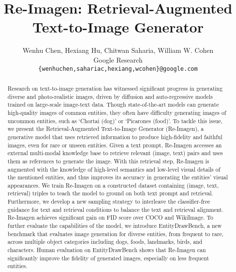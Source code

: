 \documentclass{article} \usepackage{iclr2023_conference,times}
\title{Re-Imagen: Retrieval-Augmented \\ Text-to-Image Generator}
\author{Wenhu Chen, Hexiang Hu, Chitwan Saharia, William W. Cohen \\
Google Research \\
\texttt{\{wenhuchen,sahariac,hexiang,wcohen\}@google.com}
}
\begin{document}
\maketitle

\begin{abstract}
Research on text-to-image generation has witnessed significant progress in generating diverse and photo-realistic images, driven by diffusion and auto-regressive models trained on large-scale image-text data. Though state-of-the-art models can generate high-quality images of common entities, they often have difficulty generating images of uncommon entities, such as `Chortai (dog)' or `Picarones (food)'. To tackle this issue, we present the Retrieval-Augmented Text-to-Image Generator (Re-Imagen), a generative model that uses retrieved information to produce high-fidelity and faithful images, even for rare or unseen entities. Given a text prompt, Re-Imagen accesses an external multi-modal knowledge base to retrieve relevant (image, text) pairs and uses them as references to generate the image. With this retrieval step, Re-Imagen is augmented with the knowledge of high-level semantics and low-level visual details of the mentioned entities, and thus improves its accuracy in generating the entities' visual appearances. We train Re-Imagen on a constructed dataset containing (image, text, retrieval) triples to teach the model to ground on both text prompt and retrieval. Furthermore, we develop a new sampling strategy to interleave the classifier-free guidance for text and retrieval conditions to balance the text and retrieval alignment. Re-Imagen achieves significant gain on FID score over COCO and WikiImage. To further evaluate the capabilities of the model, we introduce EntityDrawBench, a new benchmark that evaluates image generation for diverse entities, from frequent to rare, across multiple object categories including dogs, foods, landmarks, birds, and characters. Human evaluation on EntityDrawBench shows that Re-Imagen can significantly improve the fidelity of generated images, especially on less frequent entities. 
\end{abstract}
\end{document}
